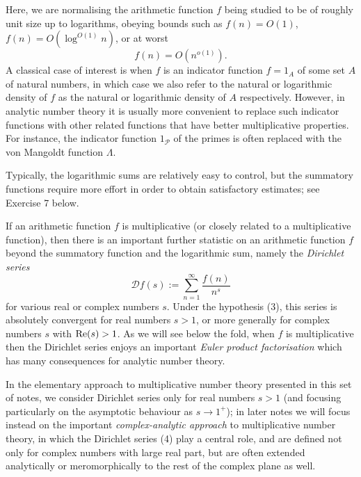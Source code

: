 \documentclass[10pt,reqno]{amsart}
\begin{document}
Here, we are normalising the arithmetic function $f$ being studied to be of roughly unit size up to logarithms, obeying bounds such as $f(n)=O(1)$, $f(n) = O(\log^{O(1)} n)$, or at worst
%
\begin{equation} f(n) = O(n^{o(1)}). \end{equation}
%
A classical case of interest is when $f$ is an indicator function $f=1_A$ of some set $A$ of natural numbers, in which case we also refer to the natural or logarithmic density of $f$ as the natural or logarithmic density of $A$ respectively. However, in analytic number theory it is usually more convenient to replace such indicator functions with other related functions that have better multiplicative properties. For instance, the indicator function $1_{\mathcal P}$ of the primes is often replaced with the von Mangoldt function $\Lambda$.

Typically, the logarithmic sums are relatively easy to control, but the summatory functions require more effort in order to obtain satisfactory estimates; see Exercise 7 below.

If an arithmetic function $f$ is multiplicative (or closely related to a multiplicative function), then there is an important further statistic on an arithmetic function $f$ beyond the summatory function and the logarithmic sum, namely the \emph{Dirichlet series}
%
\begin{equation} \mathcal{D}f(s) := \sum_{n=1}^\infty \frac{f(n)}{n^s} \end{equation}
%
for various real or complex numbers $s$. Under the hypothesis (3), this series is absolutely convergent for real numbers $s>1$, or more generally for complex numbers $s$ with $\hbox{Re}(s)>1$. As we will see below the fold, when $f$ is multiplicative then the Dirichlet series enjoys an important \emph{Euler product factorisation} which has many consequences for analytic number theory.

In the elementary approach to multiplicative number theory presented in this set of notes, we consider Dirichlet series only for real numbers $s>1$ (and focusing particularly on the asymptotic behaviour as $s \rightarrow 1^+$); in later notes we will focus instead on the important \emph{complex-analytic approach} to multiplicative number theory, in which the Dirichlet series (4) play a central role, and are defined not only for complex numbers with large real part, but are often extended analytically or meromorphically to the rest of the complex plane as well.
\end{document}
